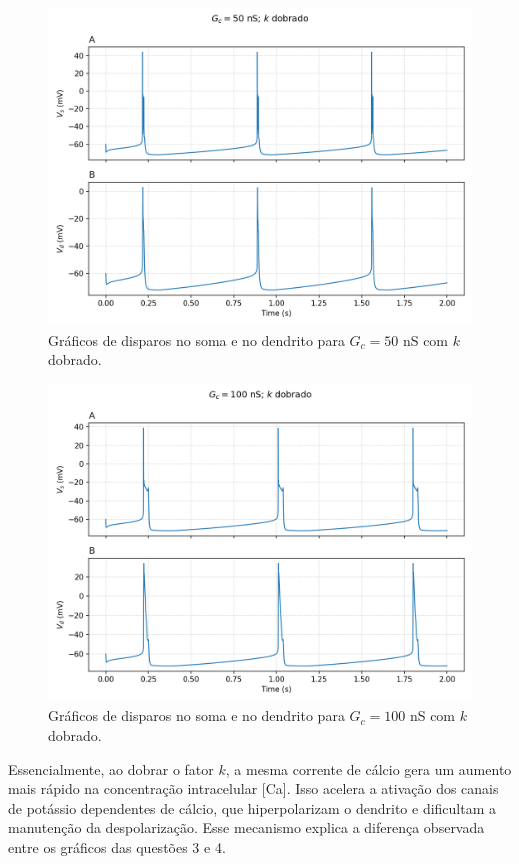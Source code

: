 \documentclass[english,11pt,a4paper]{article}
\begin{document}
	\begin{figure}[H]
		\centering
		\includegraphics[width=12cm]{../figures/ex_4_gc50.png}
		\caption{Gráficos de disparos no soma e no dendrito para $G_c = 50$ nS com $k$ dobrado.}
	\end{figure}
	
	\begin{figure}[H]
		\centering
		\includegraphics[width=12cm]{../figures/ex_4_gc100.png}
		\caption{Gráficos de disparos no soma e no dendrito para $G_c = 100$ nS com $k$ dobrado.}
	\end{figure}
	
	Essencialmente, ao dobrar o fator $k$, a mesma corrente de cálcio gera um aumento mais rápido na concentração intracelular [Ca]. Isso acelera a ativação dos canais de potássio dependentes de cálcio, que hiperpolarizam o dendrito e dificultam a manutenção da despolarização. Esse mecanismo explica a diferença observada entre os gráficos das questões 3 e 4.\\
	
\end{document}
